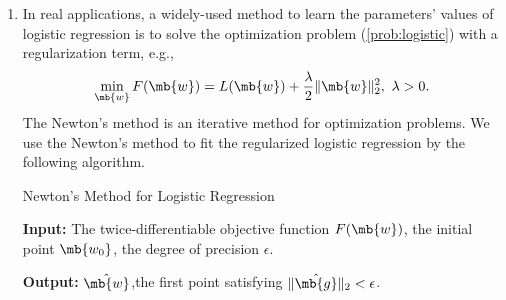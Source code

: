 \begin{exercise}
\begin{enumerate}
\begin{solution}
            \end{solution}
        \item In real applications, a widely-used method to learn the parameters' values of logistic regression is to solve the optimization problem (\ref{prob:logistic}) with a regularization term, e.g.,
            $$
                \min_{\mb{w}} F(\mb{w})=L(\mb{w})+\frac{\lambda}{2}\|\mb{w}\|_{2}^2, \  \lambda >0.
            $$
            The Newton's method is an iterative method for optimization problems.
            We use the Newton's method to fit the regularized logistic regression by the following algorithm.

            \begin{center}
                \begin{minipage}{0.9\linewidth}
                    \begin{algorithm}[H]\label{alg:newton}
                        \caption{Newton's Method for Logistic Regression }
                        \textbf{Input:} The twice-differentiable objective function $F(\mb{w})$, the initial point $\mb{w_0}$, the degree of precision $\epsilon$.

                        \textbf{Output:} $\hat{\mb{w}}$,the first point satisfying $ \|\hat{\mb{g}}\|_2 < \epsilon $.
                        

\end{algorithm}
\end{minipage}
\end{center}
\end{enumerate}
\end{exercise}
